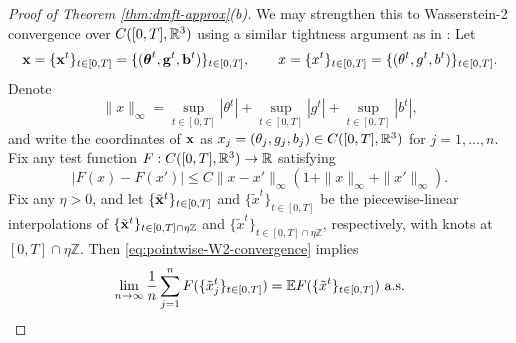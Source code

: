 \begin{proof}[Proof of Theorem \ref{thm:dmft-approx}(b)]
We may strengthen this to Wasserstein-2 convergence over $C([0,T],\mathbb{R}^3)$ using
a similar tightness argument as in \cite[Theorem 2.5(b)]{fan2025dynamicalI}:
Let
\[\mathbf{x}=\{\mathbf{x}^t\}_{t \in [0,T]}
=\{(\boldsymbol{\theta}^t,\mathbf{g}^t,\mathbf{b}^t)\}_{t \in [0,T]},
\qquad
x=\{x^t\}_{t \in [0,T]}=\{(\theta^t,g^t,b^t)\}_{t \in [0,T]}.\]
Denote
\[\|x\|_\infty=\sup_{t \in [0,T]} |\theta^t|+
\sup_{t \in [0,T]} |g^t|+\sup_{t \in [0,T]} |b^t|,\]
and write the coordinates of $\mathbf{x}$ as $x_j=(\theta_j,g_j,b_j) \in C([0,T],\mathbb{R}^3)$ for $j=1,\ldots,n$.
Fix any test function $F:C([0,T],\mathbb{R}^3) \to \mathbb{R}$ satisfying
\begin{equation}\label{eq:Fpseudolipschitz}
\big|F(x)-F(x')\big|
\leq C\|x-x'\|_\infty(1+\|x\|_\infty+\|x'\|_\infty).
\end{equation}
Fix any $\eta>0$, and let $\{\tilde{\mathbf{x}}^t\}_{t \in [0,T]}$ and $\{\tilde x^t\}_{t
\in [0,T]}$ be the piecewise-linear
interpolations of $\{\tilde {\mathbf{x}}^t\}_{t \in [0,T] \cap \eta \mathbb{Z}}$
and $\{\tilde x^t\}_{t \in [0,T] \cap \eta \mathbb{Z}}$, respectively, with
knots at $[0,T] \cap \eta \mathbb{Z}$. Then
\eqref{eq:pointwise-W2-convergence} implies
\begin{align}\label{eq:pointwise-W2-convergence-joint}
\lim_{n \to \infty} \frac{1}{n}\sum_{j=1}^n F(\{\tilde x_j^t\}_{t \in [0,T]})
=\mathbb{E} F(\{\tilde x^t\}_{t \in [0,T]}) \text{ a.s.}
\end{align}


\end{proof}
